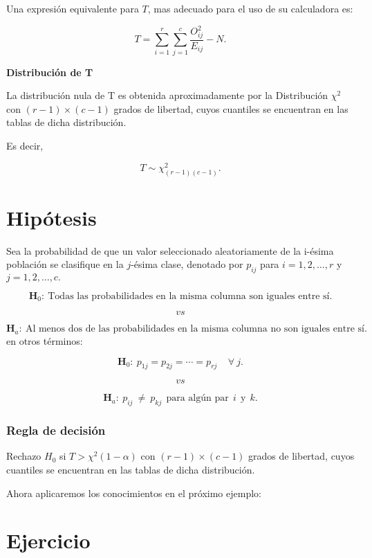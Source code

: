 \documentclass[
  a4paper,
  oneside,
  openany]{book}
\begin{document}
Una expresión equivalente para \(T\), mas adecuado para el uso de su calculadora es:

\[T=\sum_{i=1}^{r}\sum_{j=1}^{c}\frac{O_{ij}^{2}}{E_{ij}}-N.\]

\textbf{Distribución de T}

La distribución nula de T es obtenida aproximadamente por la Distribución \(\chi^2\) con \((r-1)\times(c-1)\) grados de libertad, cuyos cuantiles se encuentran en las tablas de dicha distribución.

Es decir,

\[T\sim \chi^2_{(r-1)(c-1)}.\]

\hypertarget{hipuxf3tesis-10}{%
\section{Hipótesis}\label{hipuxf3tesis-10}}

Sea la probabilidad de que un valor seleccionado aleatoriamente de la i-ésima población se clasifique en la \(j\)-ésima clase, denotado por \(p_{ij}\) para \(i= 1, 2,\ldots,r\) y \(j=1,2,\ldots,c.\)

\[\textbf{H}_0: \ \mbox{Todas las probabilidades en la misma columna son iguales entre sí.}\]

\[vs\]

\[\textbf{H}_a: \ \mbox{Al menos dos de las probabilidades en la misma columna no son iguales entre sí.}\]
en otros términos:

\[\textbf{H}_0: \ p_{1j}=p_{2j}= \cdots=p_{rj} \ \ \ \ \  \forall\  j.\]

\[vs\]

\[\textbf{H}_a: \ p_{ij} \ \neq \  p_{kj} \ \ \mbox{para algún par} \ \  i \ \ \mbox{y} \ \ k.\]

\hypertarget{regla-de-decisiuxf3n-25}{%
\subsubsection*{Regla de decisión}\label{regla-de-decisiuxf3n-25}}


Rechazo \(H_0\) si \(T> \chi^2(1-\alpha)\) con \((r-1)\times(c-1)\) grados de libertad, cuyos cuantiles se encuentran en las tablas de dicha distribución.

Ahora aplicaremos los conocimientos en el próximo ejemplo:

\hypertarget{ejercicio-1}{%
\section{Ejercicio}\label{ejercicio-1}}
\end{document}
